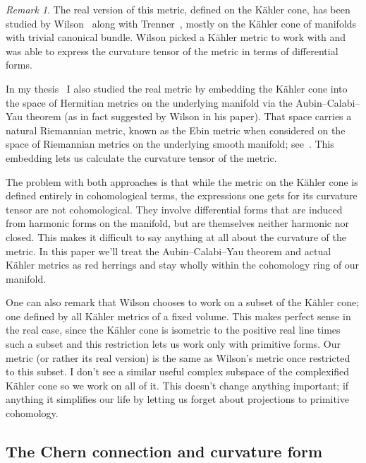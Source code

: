 \documentclass[11pt,a4paper]{amsart}
\theoremstyle{definition}
\theoremstyle{remark}
\newtheorem*{rema}{Remark}
\begin{document}
\begin{rema}
The real version of this metric, defined on the K\"{a}hler cone, has been
studied by Wilson~\cite{Wilson} along with Trenner~\cite{WilsonTrenner},
mostly on the K\"{a}hler cone of manifolds with trivial canonical bundle.
Wilson picked a K\"{a}hler metric to work with and was able to express the
curvature tensor of the metric in terms of differential forms.

In my thesis~\cite{Magnusson} I also studied the real metric by
embedding the K\"{a}hler cone into the space of Hermitian metrics on the
underlying manifold via the Aubin--Calabi--Yau theorem (as in fact
suggested by Wilson in his paper). That space carries a natural
Riemannian metric, known as the Ebin metric when considered on the space
of Riemannian metrics on the underlying smooth manifold;
see~\cite{Ebin,ClarkeRubinstein}. This embedding lets us calculate the
curvature tensor of the metric.

The problem with both approaches is that while the metric on the K\"{a}hler
cone is defined entirely in cohomological terms, the expressions one
gets for its curvature tensor are not cohomological. They involve
differential forms that are induced from harmonic forms on the manifold,
but are themselves neither harmonic nor closed. This makes it difficult
to say anything at all about the curvature of the metric. In this paper
we'll treat the Aubin--Calabi--Yau theorem and actual K\"{a}hler metrics as
red herrings and stay wholly within the cohomology ring of our manifold.

One can also remark that Wilson chooses to work on a subset of the
K\"{a}hler cone; one defined by all K\"{a}hler metrics of a fixed volume. This
makes perfect sense in the real case, since the K\"{a}hler cone is isometric
to the positive real line times such a subset and this restriction lets
us work only with primitive forms. Our metric (or rather its real version)
is the same as Wilson's metric once restricted to this subset.  I don't
see a similar useful complex subspace of the complexified K\"{a}hler
cone so we work on all of it. This doesn't change anything important; if
anything it simplifies our life by letting us forget about projections
to primitive cohomology.
\end{rema}



\subsection*{The Chern connection and curvature form}
\end{document}
